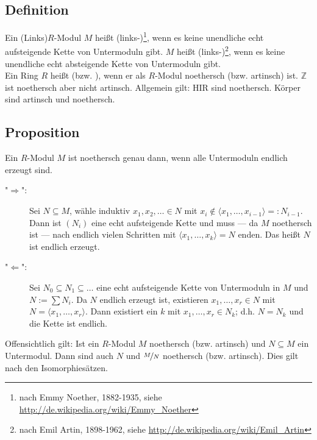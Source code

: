 \subsection[Definition: noethersch und artinsch]{Definition} %
\label{sub:211}
Ein (Links)$R$-Modul $M$ heißt (links-)\footnote{nach Emmy Noether, 1882-1935, siehe \url{http://de.wikipedia.org/wiki/Emmy_Noether}}, 
wenn es keine unendliche echt aufsteigende Kette von Untermoduln gibt.
$M$ heißt (links-)\footnote{nach Emil Artin, 1898-1962, siehe \url{http://de.wikipedia.org/wiki/Emil_Artin}}, 
wenn es keine unendliche echt absteigende Kette von Untermoduln gibt.\\
Ein Ring $R$ heißt  (bzw. ), wenn er als $R$-Modul noethersch (bzw. artinsch) ist.
$\mathds{Z}$ ist noethersch aber nicht artinsch. Allgemein gilt: HIR sind noethersch. Körper sind artinsch und noethersch.

\subsection[Proposition: noethersch $\iff$ alle Untermoduln endlich erzeugt]{Proposition} %
\label{sub:212}
Ein $R$-Modul $M$ ist noethersch genau dann, wenn alle Untermoduln endlich erzeugt sind.
\begin{description}
	\item["$\Rightarrow $":] Sei $N \subseteq M$, wähle induktiv $x_1, x_2, \ldots \in N$ mit $x_i \not\in \langle x_1, \ldots , x_{i-1} \rangle =: N_{i-1}$. Dann ist
	$(N_i)$ eine echt aufsteigende Kette und muss --- da $M$ noethersch ist --- nach endlich vielen Schritten mit $\langle x_1, \ldots , x_k \rangle =N$ enden. 
	Das heißt $N$ ist endlich erzeugt.
	\item["$\Leftarrow$":] Sei $N_0 \subseteq N_1 \subseteq \ldots $ eine echt aufsteigende Kette von Untermoduln in $M$ und $N :=\sum N_i$. 
	Da $N$ endlich erzeugt ist, existieren $x_1,\ldots ,x_r\in N$ mit $N=\langle x_1, \ldots , x_r\rangle$. Dann existiert ein $k$ mit $x_1,\ldots , x_r\in N_k$; 
	d.h. $N=N_k$ und die Kette ist endlich.\bewende
\end{description}
Offensichtlich gilt: Ist ein $R$-Modul $M$ noethersch (bzw. artinsch) und $N \subseteq M$ ein Untermodul. Dann sind auch $N$ und $\nicefrac{M}{N}$ noethersch 
(bzw. artinsch). Dies gilt nach den Isomorphiesätzen. 

